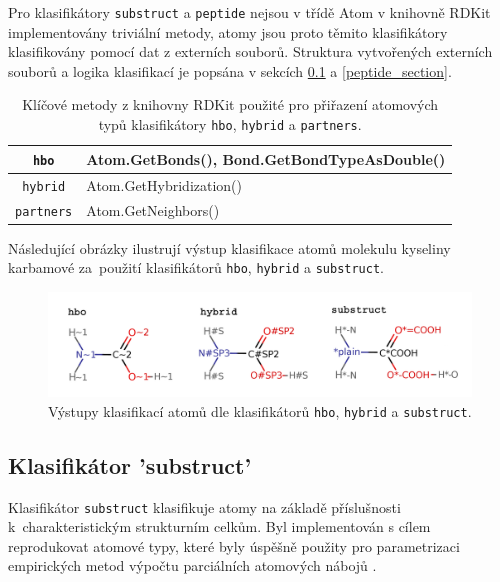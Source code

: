 Pro klasifikátory \verb|substruct| a \verb|peptide| nejsou v třídě Atom v knihovně RDKit implementovány triviální metody, atomy jsou proto těmito klasifikátory klasifikovány pomocí dat z externích souborů. Struktura vytvořených externích souborů a logika  klasifikací je popsána v sekcích \ref{substruct_section} a \ref{peptide_section}. 

\begin{table}[h]
\begin{center}
\label{atom_rdkit_methods}
\renewcommand{\arraystretch}{1.3}
    \begin{small}
    \hspace{7mm}\begin{tabular}{c|l}
        \verb|hbo| & Atom.GetBonds(), Bond.GetBondTypeAsDouble() \\
        \hline
        \verb|hybrid| & Atom.GetHybridization() \\
        \hline
        \verb|partners| & Atom.GetNeighbors() \\
    \end{tabular}
    \end{small}
    \caption{Klíčové metody z knihovny RDKit použité pro přiřazení atomových typů klasifikátory \texttt{hbo}, \texttt{hybrid} a \texttt{partners}.}
\end{center}
\end{table}

\noindent Následující obrázky ilustrují výstup klasifikace atomů molekulu kyseliny karbamové za~použití klasifikátorů \verb|hbo|, \verb|hybrid| a \verb|substruct|.

\begin{figure}[h]
    \centering
    \includegraphics[width=15cm]{pictures/karbamova_merged_popisky.png}
    \caption{Výstupy klasifikací atomů dle klasifikátorů \texttt{hbo}, \texttt{hybrid} a \texttt{substruct}.}
    \label{classfiers_karbamova}
\end{figure}

\subsection{Klasifikátor 'substruct'}
\label{substruct_section}
Klasifikátor \verb|substruct| klasifikuje atomy na základě příslušnosti k~charakteristickým strukturním celkům. Byl implementován s cílem reprodukovat atomové typy, které byly úspěšně použity pro parametrizaci empirických metod výpočtu parciálních atomových nábojů \cite{attyp2, attyp1}. 

